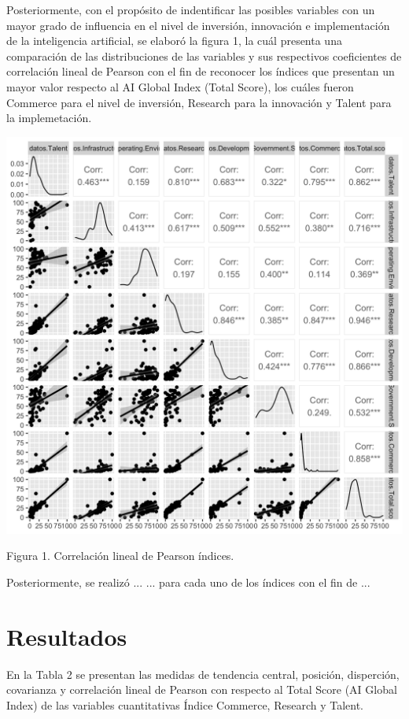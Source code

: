 \documentclass[
]{article}
\begin{document}
\begin{multicols}{2}


Posteriormente, con el propósito de indentificar las posibles variables con un mayor grado de influencia en el nivel de inversión, innovación e implementación de la inteligencia artificial, se elaboró la figura 1, la cuál presenta una comparación de las distribuciones de las variables y sus respectivos coeficientes de correlación lineal de Pearson con el fin de reconocer los índices que presentan un mayor valor respecto al AI Global Index (Total Score), los cuáles fueron Commerce para el nivel de inversión, Research para la innovación y Talent para la implemetación. 




\begin{center}
\includegraphics[width=\linewidth]{figura1.png}
\end{center}
Figura 1. Correlación lineal de Pearson índices.

Posteriormente, se realizó ... 
... para cada uno de los índices con el fin de ...

\section{Resultados}
En la Tabla 2 se presentan las medidas de tendencia central, posición, disperción, covarianza y correlación lineal de Pearson con respecto al Total Score (AI Global Index) de las variables cuantitativas Índice Commerce, Research y Talent. 


\end{multicols}
\end{document}

